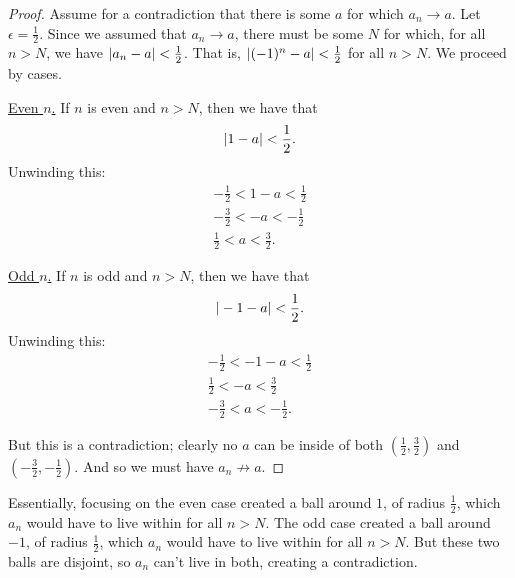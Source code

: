 \documentclass[11pt,twoside=off,numbers=noenddot]{scrbook}
\begin{document}
\begin{example}
  \begin{proof}
    Assume for a contradiction that there is
    some $a$ for which $a_n \to a$.
    Let $\epsilon = \frac{1}{2}$. Since we assumed that $a_n \to a$,
    there must be some $N$ for which, for all $n > N$, we have
    $| a_n - a | < \frac{1}{2}$. That is, $| (-1)^n - a | <
    \frac{1}{2}$ for all $n > N$. We proceed by cases.

    \underline{Even $n$.} If $n$ is even and $n > N$, then we have that
    \[ | 1 - a | < \frac{1}{2}. \]
    Unwinding this:
    \begin{gather*}
      -\frac{1}{2} < 1 - a < \frac{1}{2} \\
      -\frac{3}{2} < -a < -\frac{1}{2} \\
      \frac{1}{2} < a < \frac{3}{2}.
    \end{gather*}

    \underline{Odd $n$.} If $n$ is odd and $n > N$, then we have that
    \[ | -1 - a | < \frac{1}{2}. \]
    Unwinding this:
    \begin{gather*}
      -\frac{1}{2} < -1 - a < \frac{1}{2} \\
      \frac{1}{2} < -a < \frac{3}{2} \\
      -\frac{3}{2} < a < -\frac{1}{2}.
    \end{gather*}

    But this is a contradiction; clearly no $a$ can be inside of both
    $\left(\frac{1}{2}, \frac{3}{2}\right)$ and $\left(-\frac{3}{2},
    -\frac{1}{2}\right)$.
    And so we must have $a_n \not\to a$.
  \end{proof}

  Essentially, focusing on the even case created a ball around $1$,
  of radius $\frac{1}{2}$, which $a_n$ would have to live within
  for all $n > N$.
  The odd case created a ball around $-1$, of radius $\frac{1}{2}$,
  which $a_n$ would have to live within for all $n > N$.
  But these two balls are disjoint, so $a_n$ can't live in both,
  creating a contradiction.

  \begin{tightfigure}
    \centering
\end{tightfigure}
\end{example}
\end{document}
